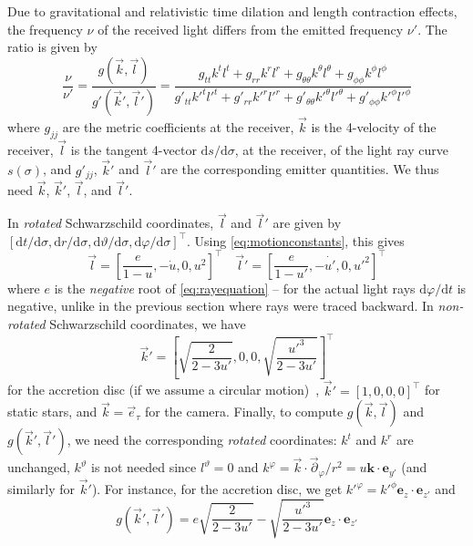 \documentclass{document}
\newcommand{\diff}{\mathrm d}
\begin{document}
Due to gravitational and relativistic time dilation and length contraction 
effects, the frequency $\nu$ of the received light differs from the emitted 
frequency $\nu'$. The ratio is given by~\cite{Philipp2017}
\begin{equation}
\frac{\nu}{\nu'} = \frac{g(\vec{k}, \vec{l})}{g'(\vec{k}', \vec{l}')} =
    \frac{g_{tt} k^t l^t + 
    	    g_{rr} k^r l^r +
    	    g_{\theta\theta} k^\theta l^\theta +
          g_{\phi\phi} k^\phi l^\phi}
         {g'_{tt} k'^t l'^t + 
         	g'_{rr}k'^rl'^r +
        	g'_{\theta\theta} k'^\theta l'^\theta +
	        g'_{\phi\phi} k'^\phi l'^\phi}
\label{eq:Doppler}
\end{equation}
where $g_{jj}$ are the metric coefficients at the receiver, $\vec{k}$ is the 
4-velocity of the receiver, $\vec{l}$ is the tangent 4-vector $\diff s / \diff 
\sigma$,  at the receiver, of the light ray curve $s(\sigma)$, and $g'_{jj}$, 
$\vec{k}'$ and $\vec{l}'$ are the corresponding emitter quantities. We thus 
need $\vec{k}$, $\vec{k}'$, $\vec{l}$, and $\vec{l}'$.

In {\em rotated} Schwarzschild coordinates, $\vec{l}$ and $\vec{l}'$ are 
given by $[\diff t / \diff \sigma, \diff r / \diff \sigma, \diff \vartheta / 
\diff \sigma, \diff\varphi / \diff \sigma]^{\top}$. Using 
\eqref{eq:motionconstants}, this gives
\begin{equation}
\vec{l} = \left[ \frac{e}{1 - u}, -\dot{u}, 0, u^2 \right]^{\top} \quad
\vec{l}' = \left[\frac{e}{1 - u'}, -\dot{u'}, 0, u'^2 \right]^{\top}
\end{equation}
where $e$ is the {\em negative} root of \eqref{eq:rayequation} -- for the  
actual light rays $\diff \varphi / \diff t$ is negative, unlike in the previous 
section where rays were traced backward. In {\em non-rotated} Schwarzschild 
coordinates, we have
\begin{equation}
\vec{k}' = \left[
    \sqrt{\frac{2}{2 - 3u'}}, 
    0,
    0,
    \sqrt{\frac{u'^3}{2 - 3u'}} \right]^{\top}
\label{eq:k_prime}
\end{equation}
for the accretion disc (if we assume a circular motion)~\cite{Philipp2017}, 
$\vec{k}' = [1, 0, 0, 0]^{\top}$ for static stars, and $\vec{k} = 
\vec{e}_{\tau}$ for the camera. Finally, to compute $g(\vec{k}, \vec{l})$ and 
$g(\vec{k}', \vec{l}')$, we need the corresponding {\em rotated} coordinates: 
$k^t$ and $k^r$ are unchanged, $k^\vartheta$ is not needed since $l^\vartheta = 
0$ and $k^\varphi = \vec{k} \cdot \vec{\partial}_\varphi/r^2 = u\mathbf{k} 
\cdot \mathbf{e}_{y'}$ (and similarly for $\vec{k}'$). For instance, for the 
accretion disc, we get $k'^\varphi = k'^\phi \mathbf{e}_z \cdot 
\mathbf{e}_{z'}$ and
\begin{equation}
g(\vec{k}', \vec{l}') = e \sqrt{\frac{2}{2 - 3u'}} - 
    \sqrt{\frac{u'^3}{2 - 3u'}} {\mathbf e}_z \cdot {\mathbf e}_{z'}
\end{equation}
\end{document}
